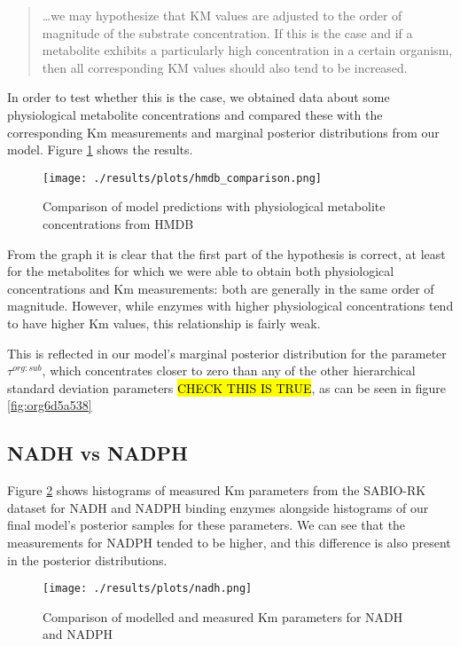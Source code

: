 \documentclass[11pt]{article}
\begin{document}
\begin{quote}
\ldots{}we may hypothesize that KM values are adjusted to the order of magnitude of
the substrate concentration. If this is the case and if a metabolite exhibits a
particularly high concentration in a certain organism, then all corresponding KM
values should also tend to be increased.
\end{quote}

In order to test whether this is the case, we obtained data about some
physiological metabolite concentrations and compared these with the
corresponding Km measurements and marginal posterior distributions from our
model. Figure \ref{fig:org0dc3ba8} shows the results.

\begin{figure}[htbp]
\centering
\texttt{[image: ./results/plots/hmdb\_comparison.png]}
\caption{\label{fig:org0dc3ba8}Comparison of model predictions with physiological metabolite concentrations from HMDB}
\end{figure}

From the graph it is clear that the first part of the hypothesis is correct, at
least for the metabolites for which we were able to obtain both physiological
concentrations and Km measurements: both are generally in the same order of
magnitude. However, while enzymes with higher physiological concentrations tend
to have higher Km values, this relationship is fairly weak.

This is reflected in our model's marginal posterior distribution for the
parameter \(\tau^{org:sub}\), which concentrates closer to zero than any of the
other hierarchical standard deviation parameters \hl{CHECK THIS IS TRUE}, as can be
seen in figure \ref{fig:org6d5a538}

\subsection{NADH vs NADPH}
\label{sec:orgd69ea28}

Figure \ref{fig:org9ec833e} shows histograms of measured Km parameters from the SABIO-RK
dataset for NADH and NADPH binding enzymes alongside histograms of our final
model's posterior samples for these parameters. We can see that the measurements
for NADPH tended to be higher, and this difference is also present in the posterior
distributions.

\begin{figure}[htbp]
\centering
\texttt{[image: ./results/plots/nadh.png]}
\caption{\label{fig:org9ec833e}Comparison of modelled and measured Km parameters for NADH and NADPH}
\end{figure}
\end{document}
